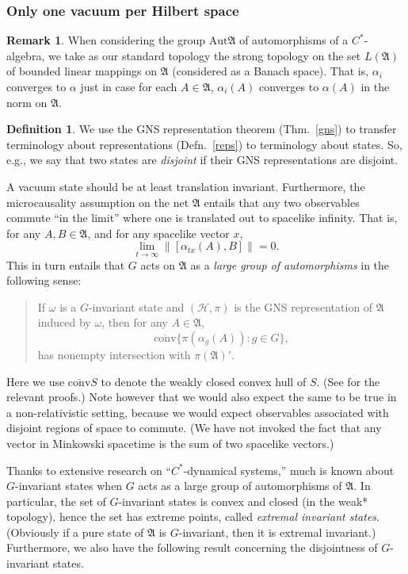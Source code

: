 \documentclass[12pt]{article}
\newcommand{\alg}[1]{\mathfrak{#1}}
\newcommand{\norm}[1]{\| #1\|}
\theoremstyle{definition}
\theoremstyle{definition}
\newtheorem{defn}[thm]{Definition}
\newtheorem{note}[thm]{Remark}
\theoremstyle{remark}
\def\2#1{{\mathcal #1}}
\def\a{\alpha} \def\b{\beta} \def\g{\gamma} \def\d{\delta}
\def\om{\omega} \def\Om{\Omega} \def\dd{\partial} \def\D{\Delta}
\newcommand{\Aut}{\mathrm{Aut}}
\begin{document}
\subsubsection{Only one vacuum per Hilbert space} \label{vacuum}

\begin{note} When considering the group $\Aut \alg{A}$ of
  automorphisms of a $C^*$-algebra, we take as our standard topology
  the strong topology on the set $L(\alg{A})$ of bounded linear
  mappings on $\alg{A}$ (considered as a Banach space).  That is, $\a
  _i$ converges to $\a$ just in case for each $A\in \alg{A}$, $\a
  _i(A)$ converges to $\a (A)$ in the norm on $\alg{A}$.  \end{note}

\begin{defn} We use the GNS representation theorem (Thm.\ \ref{gns})
  to transfer terminology about representations (Defn.\ \ref{reps}) to
  terminology about states.  So, e.g., we say that two states are
  \emph{disjoint} if their GNS representations are disjoint.
\end{defn}

A vacuum state should be at least translation invariant.  Furthermore,
the microcausality assumption on the net $\alg{A}$ entails that any
two observables commute ``in the limit'' where one is translated out
to spacelike infinity.  That is, for any $A,B\in \alg{A}$, and for any
spacelike vector $x$, $$ \lim _{t\rightarrow \infty}\norm{ [\a
  _{tx}(A),B] } =0 .$$ This in turn entails that $G$ acts on $\alg{A}$
as a \emph{large group of automorphisms} in the following sense:
\begin{quote} If $\om$ is a $G$-invariant state and $(\2H ,\pi )$ is
  the GNS representation of $\alg{A}$ induced by $\om$, then for any
  $A\in \alg{A}$, $$ \overline{\mathrm{conv}}\bigl\{ \pi (\a
  _g(A)):g\in G \bigr\} , $$ has nonempty intersection with $\pi
  (\alg{A})'$.  \end{quote} Here we use $\overline{\mathrm{conv}}S$ to
denote the weakly closed convex hull of $S$.  (See \cite{storm} for
the relevant proofs.)  Note however that we would also expect the same
to be true in a non-relativistic setting, because we would expect
observables associated with disjoint regions of space to commute.  (We
have not invoked the fact that any vector in Minkowski spacetime is
the sum of two spacelike vectors.)

Thanks to extensive research on ``$C^*$-dynamical systems,'' much is
known about $G$-invariant states when $G$ acts as a large group of
automorphisms of $\alg{A}$.  In particular, the set of $G$-invariant
states is convex and closed (in the weak* topology), hence the set has
extreme points, called \emph{extremal invariant states}.  (Obviously
if a pure state of $\alg{A}$ is $G$-invariant, then it is extremal
invariant.)  Furthermore, we also have the following result concerning
the disjointness of $G$-invariant states.
\end{document}
